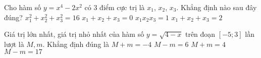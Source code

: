 \begin{ex}%
	Cho hàm số $y=x^4-2x^2$ có $3$ điểm cực trị là $x_1$, $x_2$, $x_3$. Khẳng định nào sau đây đúng? 
	\choice 
	{$x_1^2+x_2^2+x_3^2=16$}
	{\True $x_1+x_2+x_3=0$}
	{$x_1x_2x_3=1$}
	{$x_1+x_2+x_3=2$} 
\end{ex} 
\begin{ex}%
	Giá trị lớn nhất, giá trị nhỏ nhất của hàm số $y=\sqrt{4-x}$ trên đoạn $\left[-5;3\right]$ lần lượt là $M, m$. Khẳng định đúng là 
	\choice 
	{$M+m=-4$}
	{$M-m=6$}
	{\True $M+m=4$}
	{$M-m=17$} 
	\loigiai{
		Tập xác định: $\mathscr{D}=\left(-\infty ;4\right]$.\\ 
		Ta có: $y'=\dfrac{-1}{2\sqrt{4-x}}<0,\,\forall x\in \left(-\infty ;4\right)$.\\ 
		$\Rightarrow\heva {&M=\max\limits_{\left[-5;3\right]}y=y(-5)=3\\&m=\min\limits_{\left[-5;3\right]}y=y(3)=1}$ 
		$\Rightarrow M+m=4$.} 
\end{ex} 
